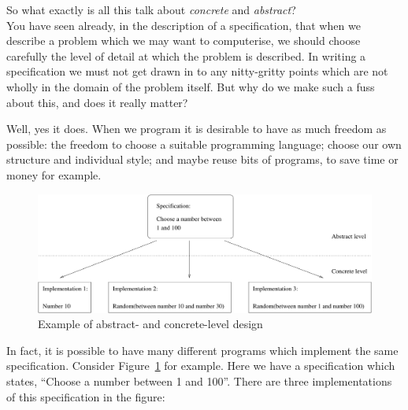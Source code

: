 So what exactly is all this talk about {\em concrete} and {\em abstract}?\\


You have seen already, in the description of a specification, that when we 
describe a problem which we may want to computerise, we should choose 
carefully the level of detail at which the problem is described. 
In writing a specification 
we must not get drawn in to any nitty-gritty points which are not
wholly in the domain of the problem itself. But why do we make such a
fuss about this, and does it really matter?

Well, yes it does. When we program it is desirable to have as much freedom as 
possible: the freedom to choose a suitable programming language; choose 
our own structure and individual style; and maybe reuse bits of programs, 
to save time or money for example.

\begin{figure}
\centering
\includegraphics[width=5in]{abstract.pdf}
  \caption{\small Example of abstract- and concrete-level design 
           \label{specimp}}
\end{figure}

\noindent
In fact, it is possible to have many different programs 
which implement the same specification. Consider Figure~\ref{specimp}
for example. 
Here we have a specification which states, ``Choose a number between 1 and 
100''. There are three implementations of this specification in the figure: 

